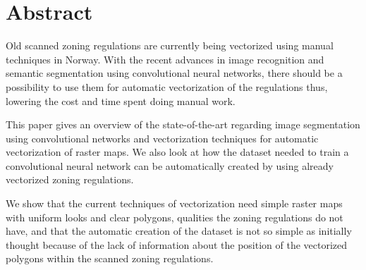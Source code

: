 \section*{Abstract}
Old scanned zoning regulations are currently being vectorized using manual techniques in Norway. With the recent advances in image recognition and semantic segmentation using convolutional neural networks, there should be a possibility to use them for automatic vectorization of the regulations thus, lowering the cost and time spent doing manual work.

This paper gives an overview of the state-of-the-art regarding image segmentation using convolutional networks and vectorization techniques for automatic vectorization of raster maps. We also look at how the dataset needed to train a convolutional neural network can be automatically created by using already vectorized zoning regulations.

We show that the current techniques of vectorization need simple raster maps with uniform looks and clear polygons, qualities the zoning regulations do not have, and that the automatic creation of the dataset is not so simple as initially thought because of the lack of information about the position of the vectorized polygons within the scanned zoning regulations.